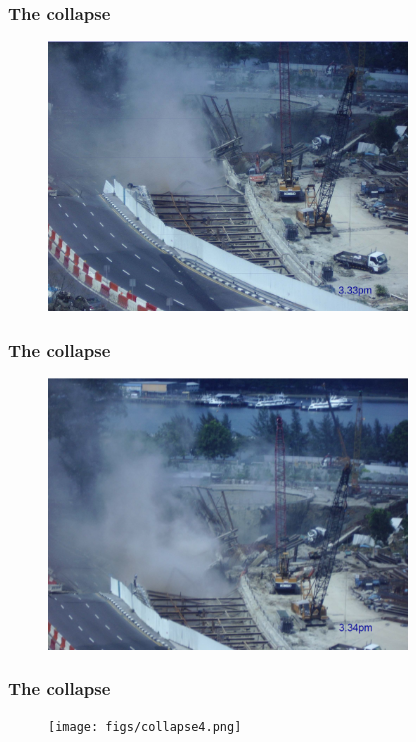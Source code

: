 \documentclass[handout]{beamer}
\begin{document}
\begin{frame}
\frametitle{The collapse}
\begin{figure}[ht]
	\centering
	\includegraphics[width=0.85\textwidth]{figs/collapse2.png}
\end{figure}
\end{frame}

\begin{frame}
\frametitle{The collapse}
\begin{figure}[ht]
	\centering
	\includegraphics[width=0.85\textwidth]{figs/collapse3.png}
\end{figure}
\end{frame}

\begin{frame}
\frametitle{The collapse}
\begin{figure}[ht]
	\centering
	\texttt{[image: figs/collapse4.png]}
\end{figure}
\end{frame}
\end{document}
